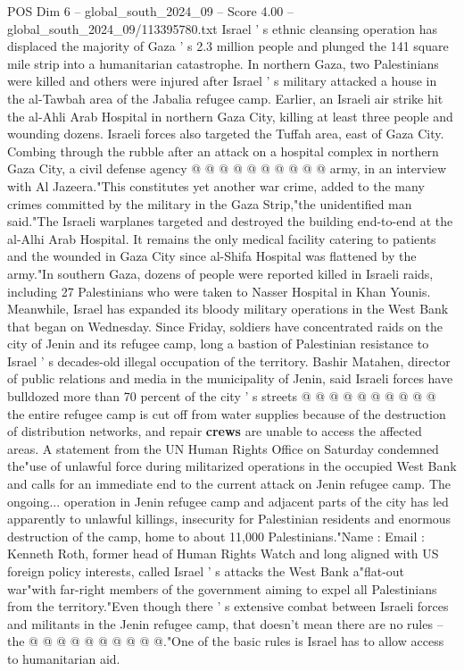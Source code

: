 \begin{textsample}{POS Dim 6 – global\_south\_2024\_09 – Score 4.00 – global\_south\_2024\_09/113395780.txt}
Israel ' s ethnic cleansing operation has displaced the majority of Gaza ' s 2.3 million people and plunged the 141 square mile strip into a humanitarian catastrophe.
In northern Gaza, two Palestinians were killed and others were injured after Israel ' s military attacked a house in the al-Tawbah area of the Jabalia refugee camp.
Earlier, an Israeli air strike hit the al-Ahli Arab Hospital in northern Gaza City, killing at least three people and wounding dozens.
Israeli forces also targeted the Tuffah area, east of Gaza City.
Combing through the rubble after an attack on a hospital complex in northern Gaza City, a civil defense agency @ @ @ @ @ @ @ @ @ @ army, in an interview with Al Jazeera."This constitutes yet another war crime, added to the many crimes committed by the military in the Gaza Strip,"the unidentified man said."The Israeli warplanes targeted and destroyed the building end-to-end at the al-Alhi Arab Hospital.
It remains the only medical facility catering to patients and the wounded in Gaza City since al-Shifa Hospital was flattened by the army."In southern Gaza, dozens of people were reported killed in Israeli raids, including 27 Palestinians who were taken to Nasser Hospital in Khan Younis.
Meanwhile, Israel has expanded its bloody military operations in the West Bank that began on Wednesday.
Since Friday, soldiers have concentrated raids on the city of Jenin and its refugee camp, long a bastion of Palestinian resistance to Israel ' s decades-old illegal occupation of the territory.
Bashir Matahen, director of public relations and media in the municipality of Jenin, said Israeli forces have bulldozed more than 70 percent of the city ' s streets @ @ @ @ @ @ @ @ @ @ the entire refugee camp is cut off from water supplies because of the destruction of distribution networks, and repair \textbf{crews} are unable to access the affected areas.
A statement from the UN Human Rights Office on Saturday condemned the"use of unlawful force during militarized operations in the occupied West Bank and calls for an immediate end to the current attack on Jenin refugee camp.
The ongoing... operation in Jenin refugee camp and adjacent parts of the city has led apparently to unlawful killings, insecurity for Palestinian residents and enormous destruction of the camp, home to about 11,000 Palestinians."Name : Email : Kenneth Roth, former head of Human Rights Watch and long aligned with US foreign policy interests, called Israel ' s attacks the West Bank a"flat-out war"with far-right members of the government aiming to expel all Palestinians from the territory."Even though there ' s extensive combat between Israeli forces and militants in the Jenin refugee camp, that doesn't mean there are no rules -- the @ @ @ @ @ @ @ @ @ @."One of the basic rules is Israel has to allow access to humanitarian aid.

\end{textsample}
